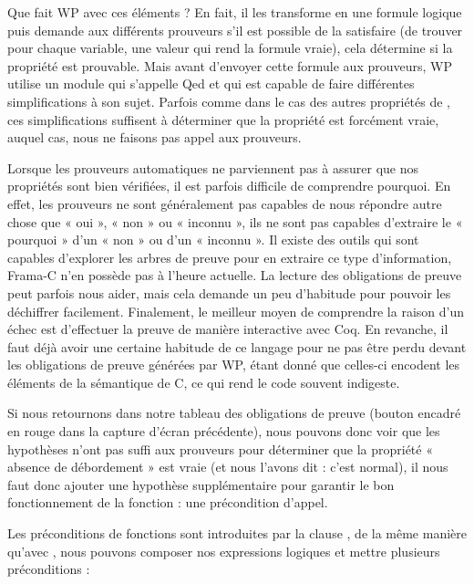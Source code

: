 Que fait WP avec ces éléments ? En fait, il les transforme en une formule 
logique puis demande aux différents prouveurs s'il est possible de la 
satisfaire (de trouver pour chaque variable, une valeur qui rend la formule 
vraie), cela détermine si la propriété est prouvable. Mais avant d'envoyer 
cette formule aux prouveurs, WP utilise un module qui s'appelle Qed et qui est
capable de faire différentes simplifications à son sujet. Parfois comme dans 
le cas des autres propriétés de , ces simplifications suffisent à 
déterminer que la propriété est forcément vraie, auquel cas, nous ne faisons
pas appel aux prouveurs.



Lorsque les prouveurs automatiques ne parviennent pas à assurer que nos 
propriétés sont bien vérifiées, il est parfois difficile de comprendre 
pourquoi. En effet, les prouveurs ne sont généralement pas capables de nous 
répondre autre chose que « oui », « non » ou « inconnu », ils ne sont pas capables
d'extraire le « pourquoi » d'un « non » ou d'un « inconnu ». Il existe des outils qui
sont capables d'explorer les arbres de preuve pour en extraire ce type 
d'information, Frama-C n'en possède pas à l'heure actuelle. La lecture des
obligations de preuve peut parfois nous aider, mais cela demande un peu 
d'habitude pour pouvoir les déchiffrer facilement. Finalement, le meilleur
moyen de comprendre la raison d'un échec est d'effectuer la preuve de manière
interactive avec Coq. En revanche, il faut déjà avoir une certaine habitude de
ce langage pour ne pas être perdu devant les obligations de preuve générées par
WP, étant donné que celles-ci encodent les éléments de la sémantique de C, ce 
qui rend le code souvent indigeste.



Si nous retournons dans notre tableau des obligations de preuve (bouton 
encadré en rouge dans la capture d'écran précédente), nous pouvons donc voir
que les hypothèses n'ont pas suffi aux prouveurs pour déterminer que la
propriété  « absence de débordement » est vraie (et nous l'avons dit : c'est
normal), il nous faut donc ajouter une hypothèse supplémentaire pour garantir
le bon fonctionnement de la fonction : une précondition d'appel.





Les préconditions de fonctions sont introduites par la clause ,
de la même manière qu'avec , nous pouvons composer nos 
expressions logiques et mettre plusieurs préconditions :



